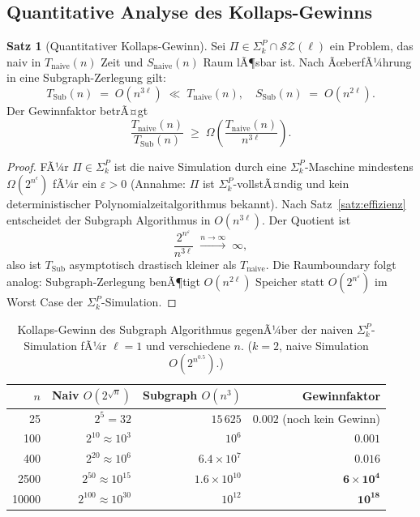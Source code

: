 ﻿\documentclass[a4paper,12pt]{article}
\theoremstyle{definition}
\newtheorem{satz}{Satz}
\begin{document}
\subsection{Quantitative Analyse des Kollaps-Gewinns}

\begin{satz}[Quantitativer Kollaps-Gewinn]
\label{satz:quant}
  Sei $\Pi \in \Sigma_k^P \cap \mathcal{SZ}(\ell)$ ein Problem, das naiv in
  $T_{\mathrm{naive}}(n)$ Zeit und $S_{\mathrm{naive}}(n)$ Raum lÃ¶sbar ist.
  Nach ÃœberfÃ¼hrung in eine Subgraph-Zerlegung gilt:
  \[
    T_{\mathrm{Sub}}(n) \;=\; O(n^{3\ell}) \;\ll\; T_{\mathrm{naive}}(n),
    \quad
    S_{\mathrm{Sub}}(n) \;=\; O(n^{2\ell}).
  \]
  Der Gewinnfaktor betrÃ¤gt
  \[
    \frac{T_{\mathrm{naive}}(n)}{T_{\mathrm{Sub}}(n)} \;\geq\; \Omega\!\left(\frac{T_{\mathrm{naive}}(n)}{n^{3\ell}}\right).
  \]
\end{satz}

\begin{proof}
  FÃ¼r $\Pi \in \Sigma_k^P$ ist die naive Simulation durch eine $\Sigma_k^P$-Maschine
  mindestens $\Omega(2^{n^\epsilon})$ fÃ¼r ein $\varepsilon > 0$
  (Annahme: $\Pi$ ist $\Sigma_k^P$-vollstÃ¤ndig und kein deterministischer
  Polynomialzeitalgorithmus bekannt).
  Nach Satz~\ref{satz:effizienz} entscheidet der Subgraph Algorithmus in $O(n^{3\ell})$.
  Der Quotient ist
  \[
    \frac{2^{n^\varepsilon}}{n^{3\ell}} \;\xrightarrow{n \to \infty}\; \infty,
  \]
  also ist $T_\mathrm{Sub}$ asymptotisch drastisch kleiner als $T_\mathrm{naive}$.
  Die Raumboundary folgt analog: Subgraph-Zerlegung benÃ¶tigt $O(n^{2\ell})$ Speicher
  statt $O(2^{n^\varepsilon})$ im Worst Case der $\Sigma_k^P$-Simulation.
\end{proof}

\begin{table}[htbp]
  \centering
  \caption{Kollaps-Gewinn des Subgraph Algorithmus gegenÃ¼ber der naiven $\Sigma_k^P$-Simulation
    fÃ¼r $\ell = 1$ und verschiedene $n$. ($k = 2$, naive Simulation $O(2^{n^{0.5}})$.)}
  \label{tab:kollaps}
  \begin{tabular}{r r r r}
    \toprule
    $n$ & Naiv $O(2^{\sqrt{n}})$ & Subgraph $O(n^3)$ & Gewinnfaktor \\
    \midrule
    25  & $2^5 = 32$              & $15\,625$         & $0.002$ (noch kein Gewinn) \\
    100 & $2^{10} \approx 10^3$   & $10^6$            & $0.001$ \\
    400 & $2^{20} \approx 10^6$   & $6.4 \times 10^7$ & $0.016$ \\
    2500& $2^{50} \approx 10^{15}$& $1.6 \times 10^{10}$ & $\mathbf{6 \times 10^4}$ \\
    10000& $2^{100} \approx 10^{30}$ & $10^{12}$ & $\mathbf{10^{18}}$ \\
    \bottomrule
  \end{tabular}
\end{table}
\end{document}
